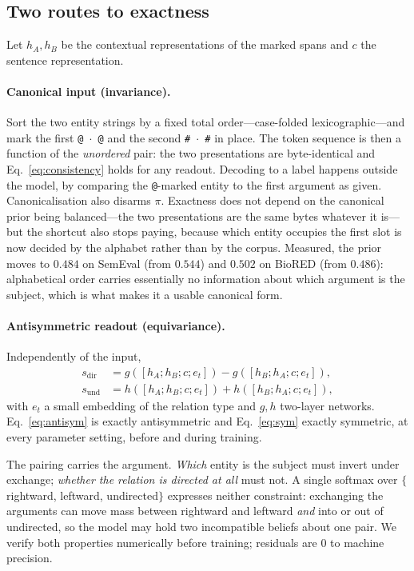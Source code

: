 \documentclass[11pt]{article}
\begin{document}
\subsection{Two routes to exactness}
\label{sec:method-arch}
Let $h_A, h_B$ be the contextual representations of the marked spans and $c$ the sentence
representation.

\paragraph{Canonical input (invariance).}
Sort the two entity strings by a fixed total order---case-folded lexicographic---and mark the
first \texttt{@\,$\cdot$\,@} and the second \texttt{\#\,$\cdot$\,\#} in place. The token
sequence is then a function of the \emph{unordered} pair: the two presentations are
byte-identical and Eq.~\ref{eq:consistency} holds for any readout. Decoding to a label happens
outside the model, by comparing the \texttt{@}-marked entity to the first argument as given.
Canonicalisation also disarms $\pi$. Exactness does not depend on the canonical prior being
balanced---the two presentations are the same bytes whatever it is---but the shortcut also
stops paying, because which entity occupies the first slot is now decided by the alphabet
rather than by the corpus. Measured, the prior moves to $0.484$ on SemEval (from $0.544$) and
$0.502$ on BioRED (from $0.486$): alphabetical order carries essentially no information about
which argument is the subject, which is what makes it a usable canonical form.

\paragraph{Antisymmetric readout (equivariance).}
Independently of the input,
\begin{align}
s_{\mathrm{dir}} &= g([h_A; h_B; c; e_t]) - g([h_B; h_A; c; e_t]), \label{eq:antisym}\\
s_{\mathrm{und}} &= h([h_A; h_B; c; e_t]) + h([h_B; h_A; c; e_t]), \label{eq:sym}
\end{align}
with $e_t$ a small embedding of the relation type and $g, h$ two-layer networks.
Eq.~\ref{eq:antisym} is exactly antisymmetric and Eq.~\ref{eq:sym} exactly symmetric, at every
parameter setting, before and during training.

The pairing carries the argument. \emph{Which} entity is the subject must invert under
exchange; \emph{whether the relation is directed at all} must not. A single softmax over
$\{$rightward, leftward, undirected$\}$ expresses neither constraint: exchanging the arguments
can move mass between rightward and leftward \emph{and} into or out of undirected, so the model
may hold two incompatible beliefs about one pair. We verify both properties numerically before
training; residuals are $0$ to machine precision.
\end{document}

